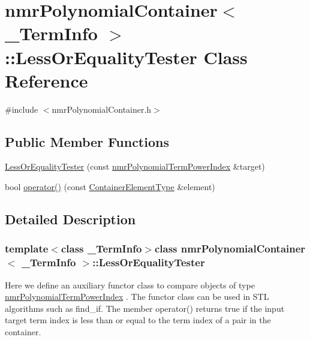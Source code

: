 \hypertarget{classnmr_polynomial_container_1_1_less_or_equality_tester}{}\section{nmr\+Polynomial\+Container$<$ \+\_\+\+Term\+Info $>$\+:\+:Less\+Or\+Equality\+Tester Class Reference}
\label{classnmr_polynomial_container_1_1_less_or_equality_tester}


{\ttfamily \#include $<$nmr\+Polynomial\+Container.\+h$>$}

\subsection*{Public Member Functions}
\begin{DoxyCompactItemize}
\item 
\hyperlink{classnmr_polynomial_container_1_1_less_or_equality_tester_ac5e840204fc626b9ba0918149f519022}{Less\+Or\+Equality\+Tester} (const \hyperlink{classnmr_polynomial_term_power_index}{nmr\+Polynomial\+Term\+Power\+Index} \&target)
\item 
bool \hyperlink{classnmr_polynomial_container_1_1_less_or_equality_tester_a56cdf4a012c6a98da376d4c7bd551b01}{operator()} (const \hyperlink{classnmr_polynomial_container_ae9c399b9034fb32315a644ebb103b4dd}{Container\+Element\+Type} \&element)
\end{DoxyCompactItemize}


\subsection{Detailed Description}
\subsubsection*{template$<$class \+\_\+\+Term\+Info$>$class nmr\+Polynomial\+Container$<$ \+\_\+\+Term\+Info $>$\+::\+Less\+Or\+Equality\+Tester}

Here we define an auxiliary functor class to compare objects of type \hyperlink{classnmr_polynomial_term_power_index}{nmr\+Polynomial\+Term\+Power\+Index} . The functor class can be used in S\+T\+L algorithms such as find\+\_\+if. The member operator() returns true if the input target term index is less than or equal to the term index of a pair in the container. 

